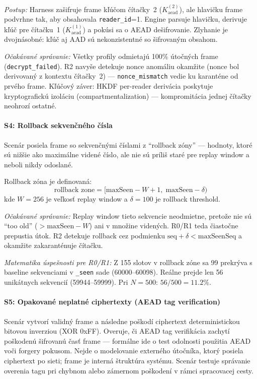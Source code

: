 \textit{Postup:} Harness zašifruje frame kľúčom čítačky~2 ($K_{\text{aead}}^{(2)}$), ale hlavičku frame podvrhne tak, aby obsahovala \texttt{reader\_id}=1. Engine parsuje hlavičku, derivuje kľúč pre čítačku~1 ($K_{\text{aead}}^{(1)}$) a pokúsi sa o AEAD dešifrovanie. Zlyhanie je dvojnásobné: kľúč aj AAD sú nekonzistentné so šifrovaným obsahom.

\textit{Očakávané správanie:} Všetky profily odmietajú 100\% útočných frame (\texttt{decrypt\_failed}). R2 navyše detekuje nonce anomáliu okamžite (nonce bol derivovaný z kontextu čítačky~2) --- \texttt{nonce\_mismatch} vedie ku karanténe od prvého frame. Kľúčový záver: HKDF per-reader derivácia poskytuje kryptografickú izoláciu (compartmentalization) --- kompromitácia jednej čítačky neohrozí ostatné.

\paragraph{S4: Rollback sekvenčného čísla}

Scenár posiela frame so sekvenčnými číslami z ``rollback zóny'' --- hodnoty, ktoré sú nižšie ako maximálne videné číslo, ale nie sú príliš staré pre replay window a neboli nikdy odoslané.

Rollback zóna je definovaná:
\begin{equation}
\text{rollback zone} = [\text{maxSeen} - W + 1, \; \text{maxSeen} - \delta)
\end{equation}
kde $W = 256$ je veľkosť replay window a $\delta = 100$ je rollback threshold.

\textit{Očakávané správanie:} Replay window tieto sekvencie neodmietne, pretože nie sú ``too old'' ($> \text{maxSeen} - W$) ani v množine videných. R0/R1 teda čiastočne prepustia útok. R2 detekuje rollback cez podmienku $\text{seq} + \delta < \text{maxSeenSeq}$ a okamžite zakaranténuje čítačku.

\textit{Matematika úspešnosti pre R0/R1:} Z 155 slotov v rollback zóne sa 99 prekrýva s baseline sekvenciami v \texttt{\_seen} sade (60000--60098). Reálne prejde len 56 unikátnych sekvencií (59944--59999). Pri $N=500$: $56/500 = 11.2\%$.

\paragraph{S5: Opakované neplatné ciphertexty (AEAD tag verification)}

Scenár vytvorí validný frame a následne poškodí ciphertext deterministickou bitovou inverziou (XOR 0xFF). Overuje, či AEAD tag verifikácia zachytí poškodenú šifrovanú časť frame --- formálne ide o test odolnosti použitia AEAD voči forgery pokusom\cite{RFC5116}. Nejde o modelovanie externého útočníka, ktorý posiela ciphertext po sieti; frame je interná štruktúra systému. Scenár testuje správanie overenia tagu pri chybnom alebo zámernom poškodení v rámci spracovacej cesty.

